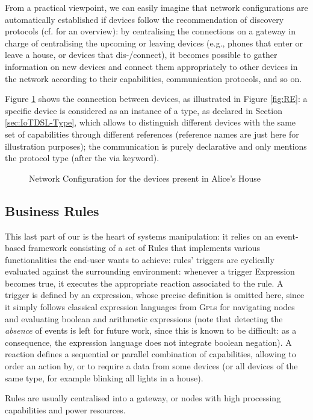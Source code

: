 From a practical viewpoint, we can easily imagine that network configurations are automatically established if devices follow the recommendation of discovery protocols (cf. \cite{} for an overview): by centralising the connections on a gateway in charge of centralising the upcoming or leaving devices (e.g., phones that enter or leave a house, or devices that dis-/connect), it becomes possible to gather information on new devices and connect them appropriately to other devices in the network according to their capabilities, communication protocols, and so on.

Figure \ref{fig:RE-Network} shows the connection between devices, as illustrated in Figure \ref{fig:RE}: a specific device is considered as an instance of a type, as declared in Section \ref{sec:IoTDSL-Type}, which allows to distinguish different devices with the same set of capabilities through different references (reference names are just here for illustration purposes); the communication is purely declarative and only mentions the protocol type (after the \textsf{via} keyword).   

\begin{figure}[t]%
\caption{Network Configuration for the devices present in Alice's House}%
\label{fig:RE-Network}%
\end{figure}	
	
\subsection{Business Rules}
\label{sec:IoTDSL-BusinessRules}

This last part of our \DSL is the heart of \IOT systems manipulation: it relies on an event-based framework consisting of a set of \textsf{Rule}s that implements various functionalities the end-user wants to achieve: rules' \textsf{trigger}s are cyclically evaluated against the surrounding environment: whenever a \textsf{trigger} \textsf{Expression} becomes true, it executes the appropriate \textsf{reaction} associated to the rule. A \textsf{trigger} is defined by an expression, whose precise definition is omitted here, since it simply follows classical expression languages from \textsc{Gpl}s for navigating nodes and evaluating boolean and arithmetic expressions (note that detecting the \emph{absence} of events is left for future work, since this is known to be difficult: as a consequence, the expression language does not integrate boolean negation). A \textsf{reaction} defines a sequential or parallel combination of capabilities, allowing to order an action by, or to require a data from some devices (or all devices of the same type, for example blinking all lights in a house).
	
Rules are usually centralised into a gateway, or nodes with high processing capabilities and power resources. 

